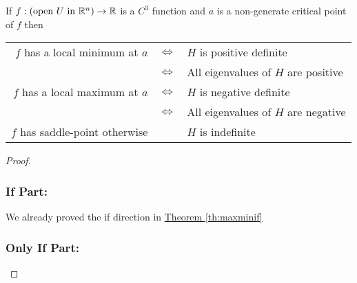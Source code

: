 \begin{theorem}{}{}
If $f:(\text{open }U\text{ in }\mathbb{R}^n )\to \mathbb{R}$ is a $C^3$  function  and $a$ is a non-generate critical point  of $f$  then 



\begin{center}
	\begin{tabular}{rcl}
		$f$ has a local minimum at $a$ & $\iff$ & $H$ is positive definite            \\
		                               & $\iff$ & All eigenvalues of $H$ are positive \\
		$f$ has a local maximum at $a$ & $\iff$ & $H$ is negative definite            \\
		                               & $\iff$ & All eigenvalues of $H$ are negative \\
		$f$ has saddle-point otherwise &        & $H$ is indefinite
	\end{tabular}
\end{center}
\end{theorem}
\begin{proof}
	\subsubsection*{If Part:}
	We already proved the if direction in \hyperref[th:maxminif]{Theorem \ref{th:maxminif}}
	
	\subsubsection*{Only If Part:}
\end{proof}
